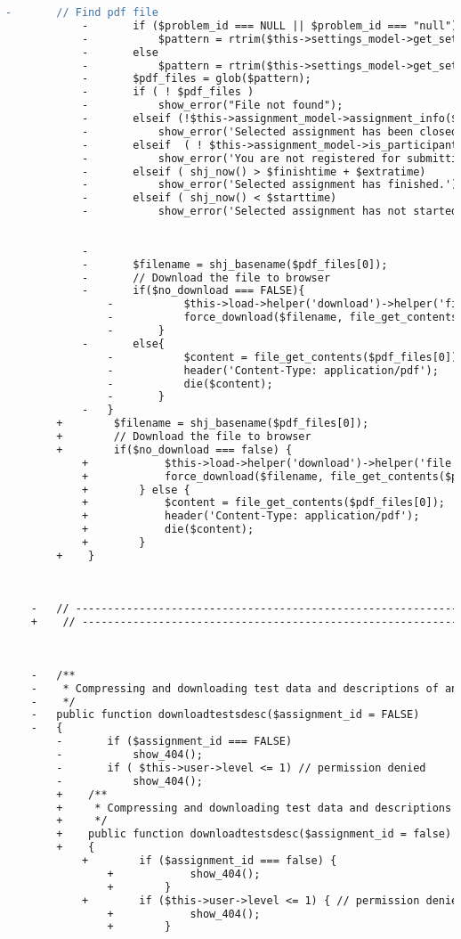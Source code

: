 \begin{lstlisting}[language=diff, caption=Perubahan pada kode Assignments.php]
			-		// Find pdf file
			-		if ($problem_id === NULL || $problem_id === "null")
			-			$pattern = rtrim($this->settings_model->get_setting('assignments_root'),'/')."/assignment_{$assignment_id}/*.pdf";
			-		else
			-			$pattern = rtrim($this->settings_model->get_setting('assignments_root'),'/')."/assignment_{$assignment_id}/p{$problem_id}/*.pdf";
			-		$pdf_files = glob($pattern);
			-		if ( ! $pdf_files )
			-			show_error("File not found");
			-		elseif (!$this->assignment_model->assignment_info($assignment_id)['open'])
			-			show_error('Selected assignment has been closed.');
			-		elseif	( ! $this->assignment_model->is_participant($this->assignment_model->assignment_info($assignment_id)['participants'],$this->user->username) )
			-			show_error('You are not registered for submitting.');
			-		elseif ( shj_now() > $finishtime + $extratime)
			-			show_error('Selected assignment has finished.');
			-		elseif ( shj_now() < $starttime)
			-			show_error('Selected assignment has not started.');
			
			
			-		
			-		$filename = shj_basename($pdf_files[0]);
			-		// Download the file to browser
			-		if($no_download === FALSE){
				-			$this->load->helper('download')->helper('file');
				-			force_download($filename, file_get_contents($pdf_files[0]), TRUE);
				-		}
			-		else{
				-			$content = file_get_contents($pdf_files[0]);
				-			header('Content-Type: application/pdf');
				-			die($content);
				-		}
			-	}
		+        $filename = shj_basename($pdf_files[0]);
		+        // Download the file to browser
		+        if($no_download === false) {
			+            $this->load->helper('download')->helper('file');
			+            force_download($filename, file_get_contents($pdf_files[0]), true);
			+        } else {
			+            $content = file_get_contents($pdf_files[0]);
			+            header('Content-Type: application/pdf');
			+            die($content);
			+        }
		+    }
	
	
	
	-	// ------------------------------------------------------------------------
	+    // ------------------------------------------------------------------------
	
	
	
	-	/**
	-	 * Compressing and downloading test data and descriptions of an assignment to the browser
	-	 */
	-	public function downloadtestsdesc($assignment_id = FALSE)
	-	{
		-		if ($assignment_id === FALSE)
		-			show_404();
		-		if ( $this->user->level <= 1) // permission denied
		-			show_404();
		+    /**
		+     * Compressing and downloading test data and descriptions of an assignment to the browser
		+     */
		+    public function downloadtestsdesc($assignment_id = false)
		+    {
			+        if ($assignment_id === false) {
				+            show_404();
				+        }
			+        if ($this->user->level <= 1) { // permission denied
				+            show_404();
				+        }
			

\end{lstlisting}
